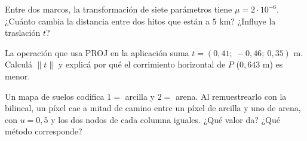 \begin{ejercicio}\label{ex:escala-ppm}
Entre dos marcos, la transformación de siete parámetros tiene \(\mu=2\cdot10^{-6}\). ¿Cuánto
cambia la distancia entre dos hitos que están a \(5\) km? ¿Influye la traslación \(t\)?
\end{ejercicio}

\begin{ejercicio}\label{ex:norma-t}
La operación que usa PROJ en la aplicación suma \(t=(0{,}41;\ -0{,}46;\ 0{,}35)\) m. Calculá
\(\lVert t\rVert\) y explicá por qué el corrimiento horizontal de \(P\) (\(0{,}643\) m) es menor.
\end{ejercicio}

\begin{ejercicio}\label{ex:categorias}
Un mapa de suelos codifica \(1=\) arcilla y \(2=\) arena. Al remuestrearlo con la bilineal, un
píxel cae a mitad de camino entre un píxel de arcilla y uno de arena, con \(u=0{,}5\) y los dos
nodos de cada columna iguales. ¿Qué valor da? ¿Qué método corresponde?
\end{ejercicio}
